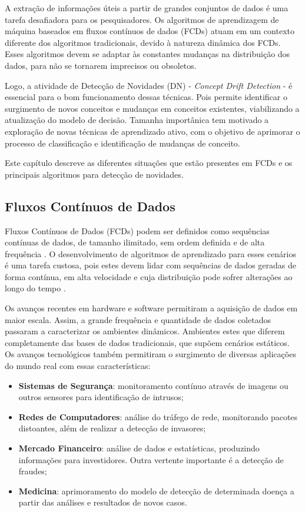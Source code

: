 \documentclass[qual, classic, a4paper]{ufbathesis}
\begin{document}
A extração de informações úteis a partir de grandes conjuntos de dados é uma tarefa desafiadora para os pesquisadores.
Os algoritmos de aprendizagem de máquina baseados em fluxos contínuos de dados (FCDs) atuam em um contexto diferente dos algoritmos tradicionais, 
devido à natureza dinâmica dos FCDs.
Esses algoritmos devem se adaptar às constantes mudanças na distribuição dos dados, para não se tornarem imprecisos ou obsoletos.

Logo, a atividade de Detecção de Novidades (DN) - \textit{Concept Drift Detection} - é essencial para o bom funcionamento dessas técnicas. Pois permite identificar o surgimento de novos conceitos e mudanças em conceitos existentes, viabilizando a atualização do modelo de decisão. Tamanha importânica tem motivado a exploração de novas técnicas de aprendizado ativo, com o objetivo de aprimorar o processo de classificação e identificação de mudanças de conceito. 

Este capítulo descreve as diferentes situações que estão presentes em FCDs e os principais algoritmos para detecção de novidades.

\subsection{Fluxos Contínuos de Dados}

Fluxos Contínuos de Dados (FCDs) podem ser definidos como sequências contínuas de dados, de tamanho ilimitado, sem ordem definida e de alta frequência \cite{Babcock:2002:MID:543613.543615}. O desenvolvimento de algoritmos de aprendizado para esses cenários é uma tarefa custosa, pois estes devem lidar com sequências de dados geradas de forma contínua, em alta velocidade e cuja distribuição pode sofrer alterações ao longo do tempo \cite{Gama:2014:survey}. 

Os avanços recentes em hardware e software permitiram a aquisição de dados em maior escala. Assim, a grande frequência e quantidade de dados coletados passaram a caracterizar os ambientes dinâmicos.  Ambientes estes que diferem completamente das bases de dados tradicionais, que supõem cenários estáticos. Os avanços tecnológicos também permitiram o surgimento de diversas aplicações do mundo real com essas características: 

\begin{itemize}
    \item \textbf{Sistemas de Segurança}: monitoramento contínuo através de imagens ou outros sensores para identificação de intrusos;

    \item \textbf{Redes de Computadores}: análise do tráfego de rede, monitorando pacotes distoantes, além de realizar a detecção de invasores;

    \item \textbf{Mercado Financeiro}: análise de dados e estatísticas, produzindo informações para investidores. Outra vertente importante é a detecção de fraudes;

    \item \textbf{Medicina}: aprimoramento do modelo de detecção de determinada doença a partir das análises e resultados de novos casos.
\end{itemize}
\end{document}
